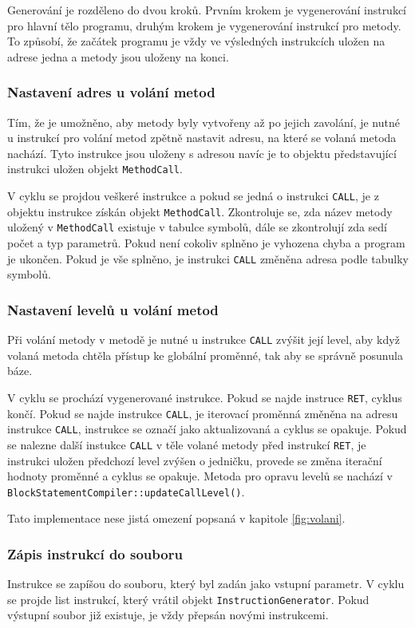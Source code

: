 \documentclass[12pt, a4paper]{article}
\begin{document}
Generování je rozděleno do dvou kroků. Prvním krokem je vygenerování instrukcí pro hlavní tělo programu, druhým krokem je vygenerování instrukcí pro metody. To způsobí, že začátek programu je vždy ve výsledných instrukcích uložen na adrese jedna a metody jsou uloženy na konci.

\subsubsection{Nastavení adres u volání metod}
\noindent Tím, že je umožněno, aby metody byly vytvořeny až po jejich zavolání, je nutné u instrukcí pro volání metod zpětně nastavit adresu, na které se volaná metoda nachází. Tyto instrukce jsou uloženy s adresou  navíc je to objektu představující instrukci uložen objekt \texttt{MethodCall}.

V cyklu se projdou veškeré instrukce a pokud se jedná o instrukci \texttt{CALL}, je z objektu instrukce získán objekt \texttt{MethodCall}. Zkontroluje se, zda název metody uložený v \texttt{MethodCall} existuje v tabulce symbolů, dále se zkontrolují zda sedí počet a typ parametrů. Pokud není cokoliv splněno je vyhozena chyba a program je ukončen. Pokud je vše splněno, je instrukci \texttt{CALL} změněna adresa podle tabulky symbolů.

\subsubsection{Nastavení levelů u volání metod} \label{fig:nastaveni}
\noindent Při volání metody v metodě je nutné u instrukce \texttt{CALL} zvýšit její level, aby	když volaná metoda chtěla přístup ke globální proměnné, tak aby se správně posunula	báze.

V cyklu se prochází vygenerované instrukce. Pokud se najde instruce \texttt{RET}, cyklus končí. Pokud se najde instrukce \texttt{CALL}, je iterovací proměnná změněna na adresu instrukce \texttt{CALL}, instrukce se označí jako aktualizovaná a cyklus se opakuje. Pokud se nalezne další instukce \texttt{CALL} v těle volané metody před instrukcí \texttt{RET}, je instrukci uložen předchozí level zvýšen o jedničku, provede se změna iterační hodnoty proměnné a cyklus se opakuje. Metoda pro opravu levelů se nachází v \texttt{BlockStatementCompiler::updateCallLevel()}.

Tato implementace nese jistá omezení popsaná v kapitole \ref{fig:volani}.

\subsubsection{Zápis instrukcí do souboru}
Instrukce se zapíšou do souboru, který byl zadán jako vstupní parametr. V cyklu se projde list instrukcí, který vrátil objekt \texttt{InstructionGenerator}. Pokud výstupní soubor již existuje, je vždy přepsán novými instrukcemi.
\end{document}
